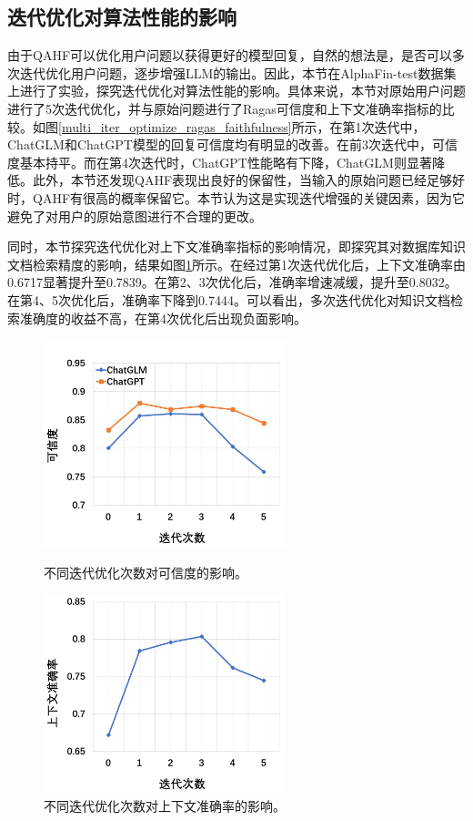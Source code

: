 \subsection{迭代优化对算法性能的影响}

由于QAHF可以优化用户问题以获得更好的模型回复，自然的想法是，是否可以多次迭代优化用户问题，逐步增强LLM的输出。因此，本节在AlphaFin-test数据集上进行了实验，探究迭代优化对算法性能的影响。具体来说，本节对原始用户问题进行了5次迭代优化，并与原始问题进行了Ragas可信度和上下文准确率指标的比较。如图\ref{multi_iter_optimize_ragas_faithfulness}所示，在第1次迭代中，ChatGLM和ChatGPT模型的回复可信度均有明显的改善。在前3次迭代中，可信度基本持平。而在第4次迭代时，ChatGPT性能略有下降，ChatGLM则显著降低。此外，本节还发现QAHF表现出良好的保留性，当输入的原始问题已经足够好时，QAHF有很高的概率保留它。本节认为这是实现迭代增强的关键因素，因为它避免了对用户的原始意图进行不合理的更改。

同时，本节探究迭代优化对上下文准确率指标的影响情况，即探究其对数据库知识文档检索精度的影响，结果如图\ref{multi_iter_optimize_ragas_precision}所示。在经过第1次迭代优化后，上下文准确率由0.6717显著提升至0.7839。在第2、3次优化后，准确率增速减缓，提升至0.8032。在第4、5次优化后，准确率下降到0.7444。可以看出，多次迭代优化对知识文档检索准确度的收益不高，在第4次优化后出现负面影响。

\begin{figure}[htbp]
	\centering
	\begin{minipage}[t]{0.49\textwidth}
		\centering
		\includegraphics[width=7cm]{Fig/multi_iter_optimize_ragas_faithfulness.png}
		\caption{\label{multi_iter_optimize_ragas_faithfulness}不同迭代优化次数对可信度的影响。}
	\end{minipage}
	\begin{minipage}[t]{0.49\textwidth}
		\centering
		\includegraphics[width=7cm]{Fig/multi_iter_optimize_ragas_precision.png}
		\caption{\label{multi_iter_optimize_ragas_precision}不同迭代优化次数对上下文准确率的影响。}
	\end{minipage}
\end{figure}

